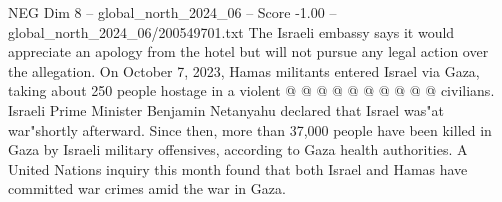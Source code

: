 \begin{textsample}{NEG Dim 8 – global\_north\_2024\_06 – Score -1.00 – global\_north\_2024\_06/200549701.txt}
The Israeli embassy says it would appreciate an apology from the hotel but will not pursue any legal action over the allegation.
On October 7, 2023, Hamas militants entered Israel via Gaza, taking about 250 people hostage in a violent @ @ @ @ @ @ @ @ @ @ civilians.
Israeli Prime Minister Benjamin Netanyahu declared that Israel was"at war"shortly afterward.
Since then, more than 37,000 people have been killed in Gaza by Israeli military offensives, according to Gaza health authorities.
A United Nations inquiry this month found that both Israel and Hamas have committed war crimes amid the war in Gaza.

\end{textsample}
